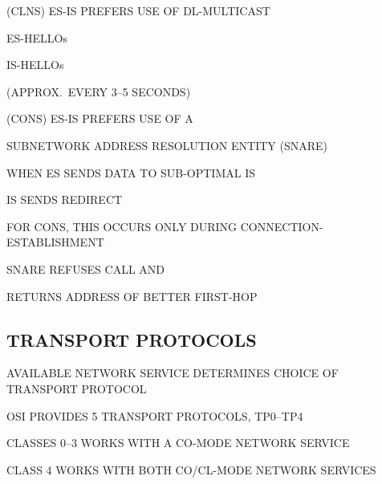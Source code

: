 \begin{bwslide}

\begin{nrtc}
\item	(CLNS) ES-IS PREFERS USE OF DL-MULTICAST
    \begin{nrtc}
    \item	ES-HELLOs

    \item	IS-HELLOs
    \end{nrtc}
    (APPROX.~EVERY 3--5 SECONDS)

\item	(CONS) ES-IS PREFERS USE OF A
    \begin{nrtc}
    \item	SUBNETWORK ADDRESS RESOLUTION ENTITY (SNARE)
    \end{nrtc}

\item	WHEN ES SENDS DATA TO SUB-OPTIMAL IS
    \begin{nrtc}
    \item	IS SENDS REDIRECT
    \end{nrtc}

\item	FOR CONS, THIS OCCURS ONLY DURING CONNECTION-ESTABLISHMENT
    \begin{nrtc}
    \item	SNARE REFUSES CALL AND

    \item	RETURNS ADDRESS OF BETTER FIRST-HOP
    \end{nrtc}
\end{nrtc}
\end{bwslide}


\begin{bwslide}
\part*	{TRANSPORT PROTOCOLS}\bf

\begin{nrtc}
\item	AVAILABLE NETWORK SERVICE DETERMINES CHOICE OF TRANSPORT PROTOCOL

\item	OSI PROVIDES 5 TRANSPORT PROTOCOLS, TP0--TP4
    \begin{nrtc}
    \item	CLASSES 0--3 WORKS WITH A CO-MODE NETWORK SERVICE

    \item	CLASS 4 WORKS WITH BOTH CO/CL-MODE NETWORK SERVICES
    \end{nrtc}
\end{nrtc}
\end{bwslide}


